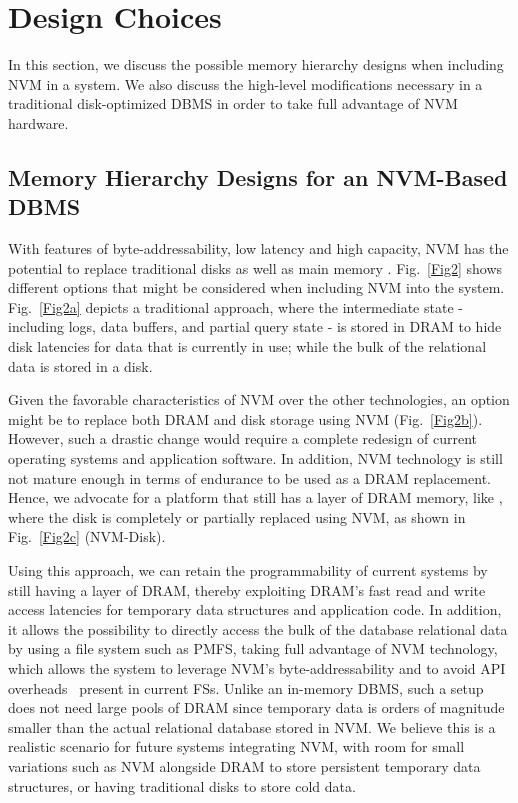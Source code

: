 \section{Design Choices}
\label{sec:Implications}
\noindent In this section, we discuss the possible memory hierarchy designs when including NVM in a system. We also discuss the high-level modifications necessary in a traditional disk-optimized DBMS in order to take full advantage of NVM hardware.
\subsection{Memory Hierarchy Designs for an NVM-Based DBMS}

With features of byte-addressability, low latency and high capacity, NVM has the potential to replace traditional disks as well as main memory \cite{chang2012limits}. Fig.~\ref{Fig2} shows different options that might be considered when including NVM into the system. Fig.~\ref{Fig2a} depicts a traditional approach, where the intermediate state - including logs, data buffers, and partial query state - is stored in DRAM to hide disk latencies for data that is currently in use; while the bulk of the relational data is stored in a  disk.

Given the favorable characteristics of NVM over the other technologies, an option might be to replace both DRAM and disk storage 
using NVM (Fig.~\ref{Fig2b}). However, such a drastic change would require a complete redesign of current operating systems and 
application software. In addition, NVM technology is still not mature enough in terms of endurance to be used as a DRAM replacement. 
Hence, we advocate for a platform that still has a layer of DRAM memory, like \cite{kimura2015foedus}, where the disk is completely or partially replaced using NVM, 
as shown in Fig.~\ref{Fig2c} (NVM-Disk). 

Using this approach, we can retain the programmability of current systems by still having a layer of DRAM, thereby exploiting DRAM's fast read and write access latencies for temporary data structures and application code. In addition, it allows the possibility to directly access the bulk of the database relational data by using a file system such as PMFS, taking full advantage of NVM technology, which allows the system to leverage NVM's byte-addressability and to avoid API overheads~\cite{huang2014nvram} present in current FSs. Unlike an in-memory DBMS, such a setup does not need large pools of DRAM since temporary data is orders of magnitude smaller than the actual relational database stored in NVM. We believe this is a realistic scenario for future systems integrating NVM, with room for small variations such as NVM alongside DRAM to store persistent temporary data structures, or having traditional disks to store cold data.

